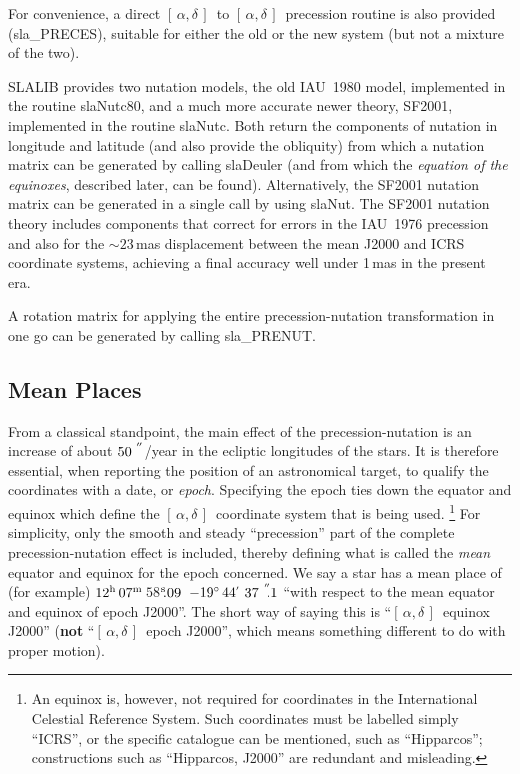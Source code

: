 \documentclass[11pt,twoside,nolof]{starlink}
\providecommand{\radec}     {$[\,\alpha,\delta\,]$}
\providecommand{\arcsec}[2] {\arcseci{#1}$\hspace{-0.4em}.#2$}
\providecommand{\arcseci}[1] {$#1\hspace{-0.05em}$\raisebox{-0.5ex}
                         {$^{'\hspace{-0.1em}'}$}}
\providecommand{\dms}[4]    {$#1^{\circ}\,#2\raisebox{-0.5ex}
                        {$^{'}$}\,$\arcsec{#3}{#4}}
\providecommand{\tseci}[1]   {$#1$\mbox{$^{\rm s}$}}
\providecommand{\tsec}[2]    {\tseci{#1}$\hspace{-0.3em}.#2$}
\providecommand{\hms}[4]    {$#1^{\rm h}\,#2^{\rm m}\,$\tsec{#3}{#4}}
\begin{document}
For convenience, a direct \radec\ to \radec\ precession routine is
also provided
(sla\_PRECES),
suitable for either the old or the new system (but not a
mixture of the two).

SLALIB provides two nutation models, the old IAU~1980 model,
implemented in the routine
slaNutc80, and a much more accurate newer theory, SF2001,
implemented in the routine
slaNutc.
Both return the components of nutation
in longitude and latitude (and also provide the obliquity) from
which a nutation matrix can be generated by calling
slaDeuler
(and from which the \textit{equation of the equinoxes}, described
later, can be found).  Alternatively,
the SF2001 nutation matrix can be generated in a single call by using
slaNut.  The SF2001 nutation theory includes components that correct
for errors in the IAU~1976 precession and also for the
$\sim 23\,$mas
displacement between the mean J2000 and ICRS coordinate systems,
achieving a final accuracy well under 1\,mas in the present era.

A rotation matrix for applying the entire precession-nutation
transformation in one go can be generated by calling
sla\_PRENUT.

\subsection{Mean Places}
From a classical standpoint,
the main effect of the precession-nutation is an increase of about
\arcseci{50}/year in the ecliptic longitudes of the stars.  It is therefore
essential, when reporting the position of an astronomical target, to
qualify the coordinates with a date, or \textit{epoch}.
Specifying the epoch ties down the equator and
equinox which define the \radec\ coordinate system that is
being used.
\footnote{An equinox is, however, not required for coordinates
in the International Celestial Reference System.  Such coordinates must
be labelled simply ``ICRS'', or the specific catalogue can be mentioned,
such as ``Hipparcos'';  constructions such as ``Hipparcos, J2000'' are
redundant and misleading.}  For simplicity, only
the smooth and steady ``precession'' part of the
complete precession-nutation effect is
included, thereby defining what is called the \textit{mean}\/
equator and equinox for the epoch concerned.  We say a star
has a mean place of (for example)
\hms{12}{07}{58}{09}~\dms{-19}{44}{37}{1} ``with respect to the mean equator
and equinox of epoch J2000''.  The short way of saying
this is ``\radec\ equinox J2000'' (\textbf{not} ``\radec\ epoch J2000'',
which means something different to do with
proper motion).
\end{document}
